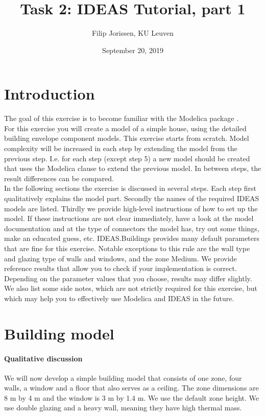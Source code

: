 \documentclass[10pt,a4paper]{article}
\begin{document}
\title{Task 2: IDEAS Tutorial, part 1}
\author{Filip Jorissen, KU Leuven}
\date{September 20, 2019}
\maketitle

\section*{Introduction}
The goal of this exercise is to become familiar with the 
Modelica package . \\

For this exercise you will create a model of a simple house,
using the detailed building envelope component models.
This exercise starts from scratch. 
Model complexity will be increased in each step by 
extending the model from the previous step. 
I.e. for each step (except step 5) a new model should be created that uses
the Modelica  clause to extend the previous model.
In between steps, the result differences can be compared.\\


In the following sections the exercise is discussed 
in several steps. 
Each step first qualitatively explains the model part.
Secondly the names of the required IDEAS models 
are listed.
Thirdly we provide high-level instructions of how to
set up the model.
If these instructions are not clear immediately, 
have a look at the model documentation and at the type of
connectors the model has, 
try out some things, 
make an educated guess, etc.
IDEAS.Buildings provides many default parameters that are fine for
this exercise. Notable exceptions to this rule are
the wall type and glazing type of walls and windows, and the zone Medium.
We provide reference results that allow you to check
if your implementation is correct. 
Depending on the parameter values that you choose, results
may differ slightly.
We also list some side notes, which are not strictly required for this
exercise, but which may help you to effectively use Modelica
and IDEAS in the future.

\section{Building  model}
\paragraph{Qualitative discussion}
We will now develop a simple building model that consists of one zone,
four walls, a window and a floor that also serves as a ceiling.
The zone dimensions are 8 m by 4 m and the window is 3 m by 1.4 m. We use the default zone height.
We use double glazing and a heavy wall, meaning they
have high thermal mass.
\end{document}
